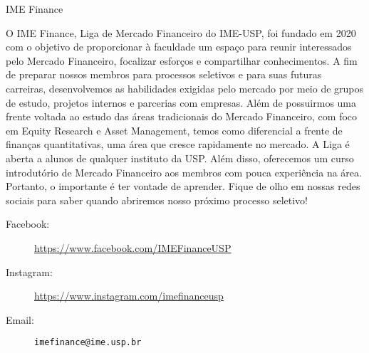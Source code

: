 \begin{subsecao}{IME Finance}

	

O IME Finance, Liga de Mercado Financeiro do IME-USP, foi fundado em 2020 com o 
objetivo de proporcionar à faculdade um espaço para reunir interessados pelo 
Mercado Financeiro, focalizar esforços e compartilhar conhecimentos.
A fim de preparar nossos membros para processos seletivos e para suas futuras 
carreiras, desenvolvemos as habilidades exigidas pelo mercado por meio de grupos de 
estudo, projetos internos e parcerias com empresas. Além de possuirmos uma frente 
voltada ao estudo das áreas tradicionais do Mercado Financeiro, com foco em Equity
Research e Asset Management, temos como diferencial a frente de finanças quantitativas, 
uma área que cresce rapidamente no mercado. A Liga é aberta a alunos de qualquer 
instituto da USP. Além disso, oferecemos um curso introdutório de Mercado Financeiro 
aos membros com pouca experiência na área. Portanto, o importante é ter vontade de 
aprender. Fique de olho em nossas redes sociais para saber quando abriremos nosso 
próximo processo seletivo!

\begin{description}
  \item[Facebook:] \url{https://www.facebook.com/IMEFinanceUSP}
  \item[Instagram:] \url{https://www.instagram.com/imefinanceusp}
  \item[Email:] {\tt imefinance@ime.usp.br}
\end{description}

\end{subsecao}
